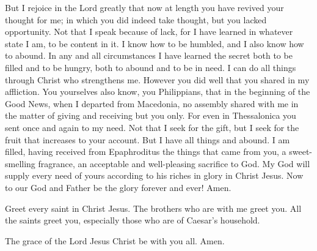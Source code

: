  But I rejoice in the Lord greatly that now at length you
have revived your thought for me; in which you did indeed take thought,
but you lacked opportunity.  Not that I speak because of
lack, for I have learned in whatever state I am, to be content in it.
 I know how to be humbled, and I also know how to abound.
In any and all circumstances I have learned the secret both to be filled
and to be hungry, both to abound and to be in need.  I
can do all things through Christ who strengthens me. 
However you did well that you shared in my affliction. 
You yourselves also know, you Philippians, that in the beginning of the
Good News, when I departed from Macedonia, no assembly shared with me in
the matter of giving and receiving but you only.  For
even in Thessalonica you sent once and again to my need. 
Not that I seek for the gift, but I seek for the fruit that increases to
your account.  But I have all things and abound. I am
filled, having received from Epaphroditus the things that came from you,
a sweet-smelling fragrance, an acceptable and well-pleasing sacrifice to
God.  My God will supply every need of yours according to
his riches in glory in Christ Jesus.  Now to our God and
Father be the glory forever and ever! Amen.

 Greet every saint in Christ Jesus. The brothers who are
with me greet you.  All the saints greet you, especially
those who are of Caesar's household.

 The grace of the Lord Jesus Christ be with you all.
Amen.
